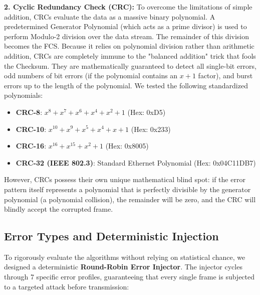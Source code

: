 \documentclass[12pt, a4paper]{article}
\begin{document}
\textbf{2. Cyclic Redundancy Check (CRC):}
To overcome the limitations of simple addition, CRCs evaluate the data as a massive binary polynomial. A predetermined Generator Polynomial (which acts as a prime divisor) is used to perform Modulo-2 division over the data stream. The remainder of this division becomes the FCS. Because it relies on polynomial division rather than arithmetic addition, CRCs are completely immune to the "balanced addition" trick that fools the Checksum. They are mathematically guaranteed to detect all single-bit errors, odd numbers of bit errors (if the polynomial contains an $x+1$ factor), and burst errors up to the length of the polynomial. We tested the following standardized polynomials:
\begin{itemize}
    \item \textbf{CRC-8}: $x^8 + x^7 + x^6 + x^4 + x^2 + 1$ (Hex: 0xD5)
    \item \textbf{CRC-10}: $x^{10} + x^9 + x^5 + x^4 + x + 1$ (Hex: 0x233)
    \item \textbf{CRC-16}: $x^{16} + x^{15} + x^2 + 1$ (Hex: 0x8005)
    \item \textbf{CRC-32 (IEEE 802.3)}: Standard Ethernet Polynomial (Hex: 0x04C11DB7)
\end{itemize}
However, CRCs possess their own unique mathematical blind spot: if the error pattern itself represents a polynomial that is perfectly divisible by the generator polynomial (a polynomial collision), the remainder will be zero, and the CRC will blindly accept the corrupted frame.

\subsection{Error Types and Deterministic Injection}
To rigorously evaluate the algorithms without relying on statistical chance, we designed a deterministic \textbf{Round-Robin Error Injector}. The injector cycles through 7 specific error profiles, guaranteeing that every single frame is subjected to a targeted attack before transmission:
\end{document}
